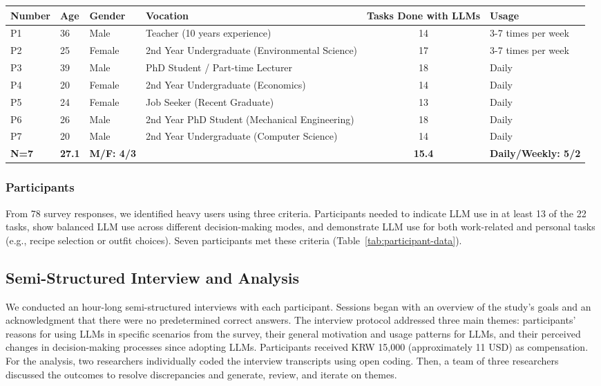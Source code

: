\begin{table*}[htbp]
\begin{tabular}{llllcl}
\toprule
\textbf{Number} & \textbf{Age} & \textbf{Gender} & \textbf{Vocation} & \textbf{Tasks Done with LLMs} & \textbf{Usage} \\
\midrule
P1  & 36 & Male & Teacher (10 years experience) & 14 & 3-7 times per week \\
P2  & 25 & Female & 2nd Year Undergraduate (Environmental Science) & 17 & 3-7 times per week \\
P3  & 39 & Male & PhD Student / Part-time Lecturer & 18 & Daily \\
P4  & 20 & Female & 2nd Year Undergraduate (Economics) & 14 & Daily \\
P5  & 24 & Female & Job Seeker (Recent Graduate) & 13 & Daily \\
P6  & 26 & Male & 2nd Year PhD Student (Mechanical Engineering) & 18 & Daily \\
P7  & 20 & Male & 2nd Year Undergraduate (Computer Science) & 14 & Daily \\
\midrule
\textbf{N=7} & \textbf{27.1} & \textbf{M/F: 4/3} & & \textbf{15.4} & \textbf{Daily/Weekly: 5/2} \\
\bottomrule
\end{tabular}
\caption{Participant Profiles and LLM Usage}
\label{tab:participant-data}
\end{table*}

\subsubsection{Participants}
From 78 survey responses, we identified heavy users using three criteria. Participants needed to indicate LLM use in at least 13 of the 22 tasks, show balanced LLM use across different decision-making modes, and demonstrate LLM use for both work-related and personal tasks (e.g., recipe selection or outfit choices). Seven participants met these criteria (Table~\ref{tab:participant-data}).

\subsection{Semi-Structured Interview and Analysis}
We conducted an hour-long semi-structured interviews with each participant. Sessions began with an overview of the study's goals and an acknowledgment that there were no predetermined correct answers. The interview protocol addressed three main themes: participants' reasons for using LLMs in specific scenarios from the survey, their general motivation and usage patterns for LLMs, and their perceived changes in decision-making processes since adopting LLMs. Participants received KRW 15,000 (approximately 11 USD) as compensation. For the analysis, two researchers individually coded the interview transcripts using open coding. Then, a team of three researchers discussed the outcomes to resolve discrepancies and generate, review, and iterate on themes.
